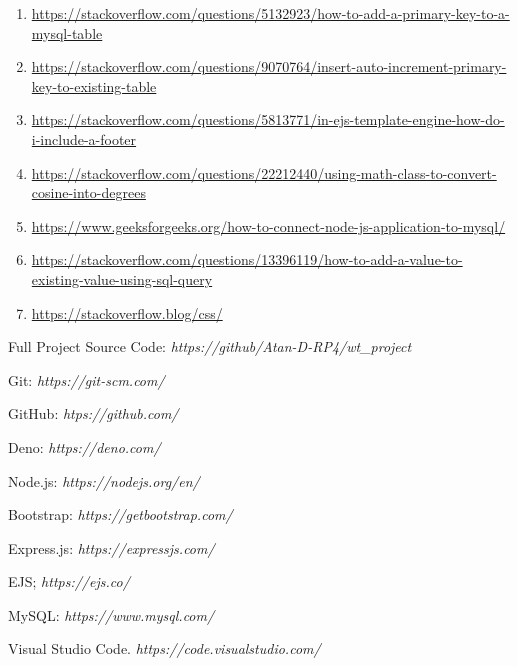 \documentclass[12pt,a4paper]{report}
\begin{document}
\begin{enumerate}
    \item \raggedright \url{https://stackoverflow.com/questions/5132923/how-to-add-a-primary-key-to-a-mysql-table}
    \item \raggedright \url{https://stackoverflow.com/questions/9070764/insert-auto-increment-primary-key-to-existing-table}
    \item \raggedright \url{https://stackoverflow.com/questions/5813771/in-ejs-template-engine-how-do-i-include-a-footer}
    \item \raggedright \url{https://stackoverflow.com/questions/22212440/using-math-class-to-convert-cosine-into-degrees}
    \item \raggedright \url{https://www.geeksforgeeks.org/how-to-connect-node-js-application-to-mysql/}
    \item \raggedright \url{https://stackoverflow.com/questions/13396119/how-to-add-a-value-to-existing-value-using-sql-query}
    \item \raggedright \url{https://stackoverflow.blog/css/}
\end{enumerate}

\begin{thebibliography}{9}
    Full Project Source Code: \textit{https://github/Atan-D-RP4/wt\_project}

    Git: \textit{https://git-scm.com/}

    GitHub: \textit{htps://github.com/}

    Deno: \textit{https://deno.com/}

    Node.js: \textit{https://nodejs.org/en/}

    Bootstrap: \textit{https://getbootstrap.com/}

    Express.js: \textit{https://expressjs.com/}

    EJS; \textit{https://ejs.co/}

    MySQL: \textit{https://www.mysql.com/}

    Visual Studio Code. \textit{https://code.visualstudio.com/}
\end{thebibliography}
\end{document}
